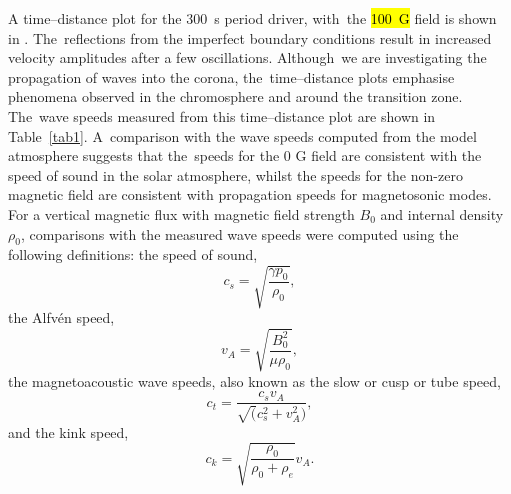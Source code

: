 \documentclass[physics,article,accept,pdftex,moreauthors]{Definitions/mdpi}
\begin{document}
A  time--distance plot for the 300~s period driver, with~the 
 \hl{100~G} %
field is shown in %
. The~reflections from the imperfect boundary conditions result in increased velocity amplitudes after a few oscillations. Although~we are investigating the propagation of waves into the corona, the~time--distance plots emphasise phenomena observed in the chromosphere and around the transition zone.  The~wave speeds measured from this time--distance plot are shown in Table~\ref{tab1}. A~comparison with the wave speeds computed from the model atmosphere suggests that the~speeds for the 0 G field are consistent with the speed of sound in the solar atmosphere, whilst the speeds for the non-zero magnetic field are consistent with propagation speeds for magnetosonic modes.
For a  vertical magnetic flux %
with magnetic field strength $B_{0}$ and internal density $\rho_{0}$, comparisons with the measured wave speeds were computed using the following definitions:
the speed of sound,
\begin{equation}
 c_{s}  =    \sqrt{\frac{\gamma p_0}{\rho_0}}, 
\label{e10}
\end{equation}
the Alfv\'en speed,
\begin{equation}
 v_{A}  =    \sqrt{\frac{B_{0}^{2}}{\mu\rho_{0}}},  
\label{e11}
\end{equation}
the magnetoacoustic wave speeds, also known as  the slow or cusp or tube speed,
\begin{equation}
 c_{t}  =    \frac{c_s v_A}{\sqrt(c_s^2+v_A^2)}, 
\label{e12}
\end{equation}
and the kink speed,
\begin{equation}
 c_{k}  =    \sqrt{\frac{\rho_0}{\rho_0+\rho_e}}v_A.
\label{e12}
\end{equation}
\end{document}
